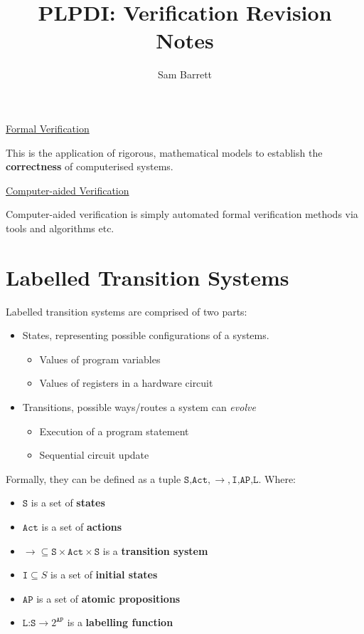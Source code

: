 \message{ !name(verif-revisionnotes.tex)}\documentclass{article}
\title{PLPDI: Verification Revision Notes}
\author{Sam Barrett}
\begin{document}

\maketitle

\underline{Formal Verification}

This is the application of rigorous, mathematical models to establish the \textbf{correctness} of computerised systems.

\underline{Computer-aided Verification}

Computer-aided verification is simply automated formal verification methods via tools and algorithms etc.

\section{Labelled Transition Systems}

Labelled transition systems are comprised of two parts:

\begin{itemize}
  \item States, representing possible configurations of a systems.
        \begin{itemize}
          \item Values of program variables
          \item Values of registers in a hardware circuit
        \end{itemize}
  \item Transitions, possible ways/routes a system can \textit{evolve}
        \begin{itemize}
          \item Execution of a program statement
          \item Sequential circuit update
        \end{itemize}
\end{itemize}

Formally, they can be defined as a tuple $\texttt{S,Act},\rightarrow , \texttt{I,AP,L} $.
Where:
\begin{itemize}
  \item $\texttt{S} $ is a set of \textbf{states}
  \item $\texttt{Act}$ is a set of \textbf{actions}
  \item $\rightarrow \subseteq \texttt{S}\times \texttt{Act} \times \texttt{S} $ is a \textbf{transition system}
  \item $\texttt{I} \subseteq S$ is a set of \textbf{initial states}
  \item $\texttt{AP} $ is a set of \textbf{atomic propositions}
  \item $\texttt{L:S} \rightarrow 2^{\texttt{AP} } $ is a \textbf{labelling function}
\end{itemize}
\end{document}
